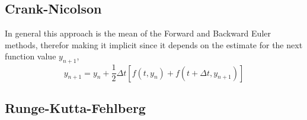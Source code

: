 \documentclass{aa}
\begin{document}
\subsection{Crank-Nicolson}%
\label{sub:crank_nicolson}
In general this approach is the mean of the Forward and Backward Euler methods, therefor making
it implicit since it depends on the estimate for the next function value \(y_{n+1}\),
\begin{equation}
    \label{eqn:crank-nicolson}
    y_{n+1} = y_n + \frac{1}{2} \Delta t \left[f(t, y_n) + f(t + \Delta t, y_{n+1})\right]
\end{equation}

\subsection{Runge-Kutta-Fehlberg}%
\label{sub:runge_kutta_fehlberg}
\end{document}
